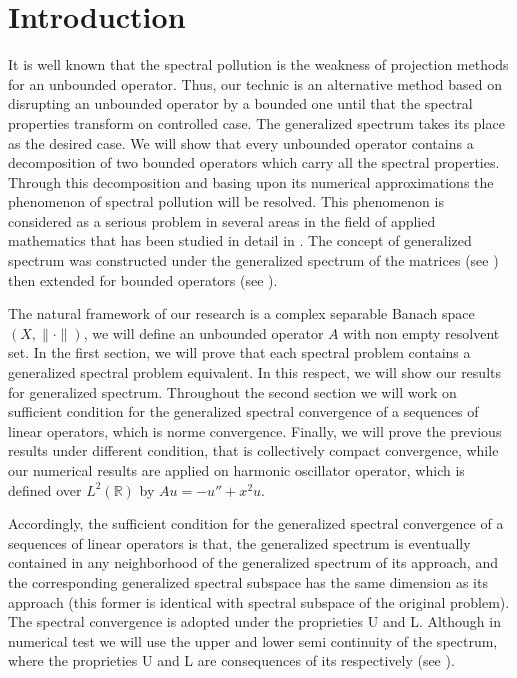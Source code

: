\documentclass[
11pt,%
tightenlines,%
twoside,%
onecolumn,%
nofloats,%
nobibnotes,%
nofootinbib,%
superscriptaddress,%
noshowpacs,%
centertags]%
{revtex4}
\begin{document}
\section{Introduction}
It is well known that the spectral pollution is the weakness  of
projection methods for an unbounded operator. Thus, our technic is
an alternative method based on disrupting an unbounded operator by a
bounded one until that the spectral properties transform on
controlled case. The generalized spectrum takes its place as the
desired case. We will show that every unbounded operator contains a
decomposition of two bounded operators which carry all the spectral
properties. Through this decomposition and basing upon its numerical
approximations the phenomenon of spectral pollution will be
resolved. This phenomenon is considered as a serious  problem in
several areas in the field of applied mathematics that has been
studied in detail in \cite{bib9,bib18,bib19}. The concept of
generalized spectrum was constructed under the generalized spectrum
of the matrices (see \cite{bib5}) then extended for bounded
operators (see \cite{bib22,bib16}).\par The natural framework of our
research is a complex separable Banach space $(X,\|\cdot\|)$, we
will define an unbounded operator $A$ with non empty resolvent set.
In the first section, we will prove that each spectral problem
contains a generalized spectral problem equivalent. In this respect,
we will show our results for generalized spectrum. Throughout the
second section we will work on sufficient condition for the
generalized spectral convergence of a sequences of linear operators,
which is norme convergence. Finally, we will prove the previous
results under different condition, that is collectively compact
convergence, while our numerical results are applied on harmonic
oscillator operator, which is defined over $L^{2}(\mathbb{R})$ by
$
    Au=-u''+x^{2}u.
$

Accordingly, the sufficient condition for the generalized spectral
convergence of a sequences of linear operators is that, the
generalized spectrum is eventually contained in any neighborhood of
the generalized spectrum of its approach, and the corresponding
generalized spectral subspace has the same dimension as its approach
(this former is identical with spectral subspace of the original
problem). The spectral convergence is adopted under the proprieties
U and L. Although in numerical test we will use the upper and lower
semi continuity of the spectrum, where the proprieties U and L are
consequences of its respectively (see \cite{bib4}).
\end{document}
